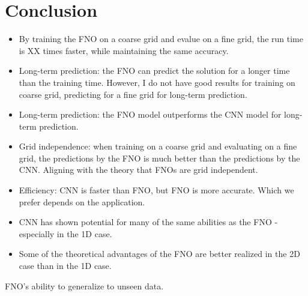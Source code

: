 \chapter{Conclusion}\label{ch:conclusion}


\begin{itemize}
    \item By training the FNO on a coarse grid and evalue on a fine grid, the run time is XX times faster, while maintaining the same accuracy.
    \item Long-term prediction: the FNO can predict the solution for a longer time than the training time. However, I do not have good results for training on coarse grid, predicting for a fine grid for long-term prediction.
    \item Long-term prediction: the FNO model outperforms the CNN model for long-term prediction.
    \item Grid independence: when training on a coarse grid and evaluating on a fine grid, the predictions by the FNO is much better than the predictions by the CNN. Aligning with the theory that FNOs are grid independent.
    \item Efficiency: CNN is faster than FNO, but FNO is more accurate. Which we prefer depends on the application.
    \item CNN has shown potential for many of the same abilities as the FNO - especially in the 1D case.
    \item Some of the theoretical advantages of the FNO are better realized in the 2D case than in the 1D case.
\end{itemize}




FNO's ability to generalize to unseen data.